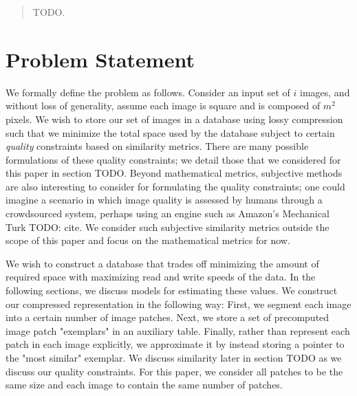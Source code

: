 \documentclass{vldb}
\begin{document}
\maketitle

\begin{abstract}
TODO.
\end{abstract}





\section{Problem Statement}


We formally define the problem as follows.  Consider an input set of $i$ images, and without loss of generality, assume each image is square and is composed of $m^2$ pixels.  We wish to store our set of images in a database using lossy compression such that we minimize the total space used by the database subject to certain \emph{quality} constraints based on similarity metrics.  There are many possible formulations of these quality constraints; we detail those that we considered for this paper in section TODO.  Beyond mathematical metrics, subjective methods are also interesting to consider for formulating the quality constraints; one could imagine a scenario in which image quality is assessed by humans through a crowdsourced system, perhaps using an engine such as Amazon's Mechanical Turk TODO: cite.  We consider such subjective similarity metrics outside the scope of this paper and focus on the mathematical metrics for now.

We wish to construct a database that trades off minimizing the amount of required space with maximizing read and write speeds of the data.  In the following sections, we discuss models for estimating these values.  We construct our compressed representation in the following way: First, we segment each image into a certain number of image patches.  Next, we store a set of precomputed image patch "exemplars" in an auxiliary table.  Finally, rather than represent each patch in each image explicitly, we approximate it by instead storing a pointer to the "most similar" exemplar.  We discuss similarity later in section TODO as we discuss our quality constraints.  For this paper, we consider all patches to be the same size and each image to contain the same number of patches.
\end{document}
